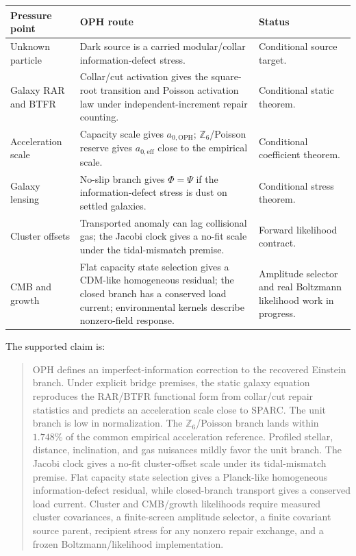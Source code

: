 \documentclass[11pt]{article}
\newcommand{\aoph}{a_{0,\mathrm{OPH}}}
\newcommand{\aeff}{a_{0,\mathrm{eff}}}
\newcommand{\Zsix}{\mathbb Z_6}
\begin{document}
\begin{longtable}{@{}p{}p{}p{}@{}}
\toprule
Pressure point & OPH route & Status \\
\midrule
\endhead
Unknown particle & Dark source is a carried modular/collar information-defect
stress. & Conditional source target. \\
Galaxy RAR and BTFR & Collar/cut activation gives the square-root transition
and Poisson activation law under independent-increment repair counting. &
Conditional static theorem. \\
Acceleration scale & Capacity scale gives \(\aoph\); \(\Zsix\)/Poisson reserve
gives \(\aeff\) close to the empirical scale. & Conditional coefficient
theorem. \\
Galaxy lensing & No-slip branch gives \(\Phi=\Psi\) if the information-defect
stress is dust on settled galaxies. & Conditional stress theorem. \\
Cluster offsets & Transported anomaly can lag collisional gas; the Jacobi
clock gives a no-fit scale under the tidal-mismatch premise. & Forward
likelihood contract. \\
CMB and growth & Flat capacity state selection gives a CDM-like homogeneous
residual; the closed branch has a conserved load current; environmental
kernels describe nonzero-field response. & Amplitude selector and real
Boltzmann likelihood work in progress. \\
\bottomrule
\end{longtable}

The supported claim is:
\begin{quote}
OPH defines an imperfect-information correction to the recovered Einstein
branch.  Under explicit bridge premises, the static galaxy equation reproduces
the RAR/BTFR functional form from collar/cut repair statistics and predicts an
acceleration scale close to SPARC.  The unit branch is low in normalization.
The \(\Zsix\)/Poisson branch lands within \(1.748\%\) of the common empirical
acceleration reference.  Profiled stellar, distance, inclination, and gas
nuisances mildly favor the unit branch.  The Jacobi clock gives a no-fit
cluster-offset scale under its tidal-mismatch premise.  Flat capacity state
selection gives a Planck-like homogeneous information-defect residual, while
closed-branch transport gives a conserved load current.  Cluster and
CMB/growth likelihoods require measured cluster covariances, a finite-screen
amplitude selector, a finite covariant source parent, recipient stress for any
nonzero repair exchange, and a frozen Boltzmann/likelihood implementation.
\end{quote}
\end{document}
